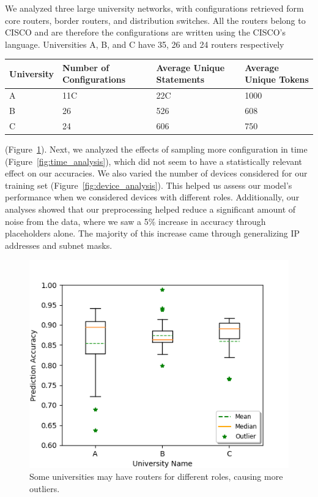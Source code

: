 We analyzed three large university networks, with configurations retrieved form core routers, border routers, and distribution switches. All the routers belong to CISCO and are therefore the configurations are written using the CISCO's language. Universities A, B, and C have 35, 26 and 24 routers respectively


\begin{center}
    \begin{tabular}{ | p{1.5cm} | p{1.5cm}| p{2cm} |  p{1.5cm} |} 
    \hline
    University & Number of Configurations & Average Unique Statements & Average Unique Tokens \\ \hline
    A & 11C & 22C &1000 \\  \hline
    B & 26 & 526 & 608  \\ \hline
    C & 24 & 606 & 750\\  \hline
    \end{tabular}
\end{center}

(Figure~\ref{fig:uni_analysis}). Next, we analyzed the effects of sampling more configuration in time (Figure~\ref{fig:time_analysis}), which did not seem to have a statistically relevant effect on our accuracies. We also varied the number of devices considered for our training set (Figure~\ref{fig:device_analysis}). This helped us assess our model's performance when we considered devices with different roles. Additionally, our analyses showed that our preprocessing helped reduce a significant amount of noise from the data, where we saw a 5\% increase in accuracy through placeholders alone. The majority of this increase came through generalizing IP addresses and subnet masks.\\

\begin{figure}
	\centering
	\includegraphics[width=\columnwidth]{uni_analysis.png}
	\caption{Some universities may have routers for different roles, causing more outliers.}
    \label{fig:uni_analysis}
\end{figure}

